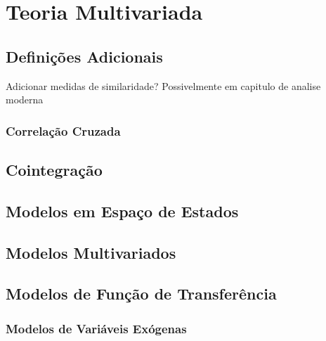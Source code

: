 \chapter{Teoria Multivariada}

\section{Definições Adicionais}

Adicionar medidas de similaridade? Possivelmente em capitulo de analise
moderna

\subsection{Correlação Cruzada}

\section{Cointegração}

\section{Modelos em Espaço de Estados}

\section{Modelos Multivariados}

\section{Modelos de Função de Transferência}

\subsection{Modelos de Variáveis Exógenas}
